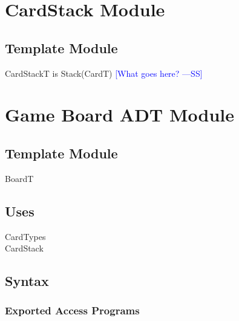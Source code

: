 \documentclass[12pt]{article}
\newcommand{\authornote}[3]{\textcolor{#1}{[#3 ---#2]}}
\newcommand{\authornote}[3]{}
\newcommand{\wss}[1]{\authornote{blue}{SS}{#1}}
\begin{document}
\newpage

\section* {CardStack Module}

\subsection* {Template Module}

CardStackT is Stack(CardT)  \wss{What goes here?}

\newpage

\section* {Game Board ADT Module}

\subsection*{Template Module}

BoardT

\subsection* {Uses}

\noindent CardTypes\\
\noindent CardStack

\subsection* {Syntax}

\subsubsection* {Exported Access Programs}
\end{document}
